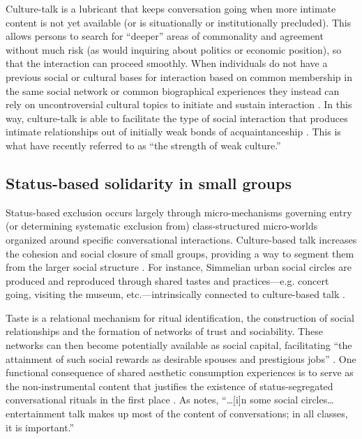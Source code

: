 \documentclass[11pt]{article}
\begin{document}
Culture-talk is a lubricant that keeps conversation going when more intimate content is not yet available (or is situationally or institutionally precluded).  This allows persons to search for ``deeper'' areas of commonality and agreement without much risk (as would inquiring about politics or economic position), so that the interaction can proceed smoothly.   When individuals do not have a previous social or cultural bases for interaction based on common membership in the same social network or common biographical experiences they instead can rely on uncontroversial cultural topics to initiate and sustain interaction \citep[460]{fine77}. In this way, culture-talk is able to facilitate the type of social interaction that produces intimate relationships out of initially weak bonds of acquaintanceship \citep[441]{dimaggio87}.  This is what \citet{schultz_breiger10} have recently referred to as ``the strength of weak culture.'' 

\subsection{Status-based solidarity in small groups}
Status-based exclusion occurs largely through micro-mechanisms governing entry (or determining systematic exclusion from) class-structured micro-worlds organized around specific conversational interactions.  Culture-based talk increases the cohesion and social closure of small groups, providing a way to segment them from the larger social structure \citep{fine77}.  For instance,  Simmelian urban social circles are produced and reproduced through shared tastes and practices---e.g. concert going, visiting the museum, etc.---intrinsically connected to culture-based talk \citeyearpar[797]{kadushin66}. 

Taste is a relational mechanism for ritual identification, the construction of social relationships and the formation of networks of trust and sociability.  These networks can then become potentially available as social capital, facilitating ``the attainment of such social rewards as desirable spouses and prestigious jobs'' \citep[443]{dimaggio87}.  One functional consequence of shared aesthetic consumption experiences is to serve as the non-instrumental content that justifies the existence of status-segregated conversational rituals in the first place \citep{ostrower98}. As \citet[125]{collins75} notes, ``\ldots [i]n some social circles{\ldots}entertainment talk makes up most of the content of conversations; in all classes, it is important.'' 
\end{document}
